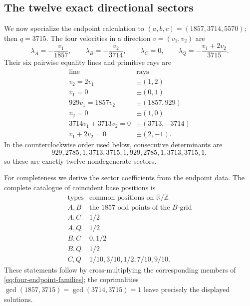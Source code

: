 \documentclass[11pt,reqno,letterpaper]{amsart}
\numberwithin{equation}{section}
\theoremstyle{definition}
\theoremstyle{remark}
\begin{document}
\subsection{The twelve exact directional sectors}

We now specialize the endpoint calculation to
\((a,b,c)=(1857,3714,5570)\); then \(q=3715\).  The four velocities in a
direction \(v=(v_1,v_2)\) are
\begin{equation}\label{eq:four-endpoint-velocities}
 \lambda_A=-\frac{v_1}{1857},\qquad
 \lambda_B=-\frac{v_2}{3714},\qquad
 \lambda_C=0,\qquad
 \lambda_Q=-\frac{v_1+2v_2}{3715}.
\end{equation}
Their six pairwise equality lines and primitive rays are
\begin{equation}\label{eq:six-fan-walls}
 \begin{array}{c|c}
 \text{line}&\text{rays}\\ \hline
 v_2=2v_1&\pm(1,2)\\
 v_1=0&\pm(0,1)\\
 929v_1=1857v_2&\pm(1857,929)\\
 v_2=0&\pm(1,0)\\
 3714v_1+3713v_2=0&\pm(3713,-3714)\\
 v_1+2v_2=0&\pm(2,-1).
 \end{array}
\end{equation}
In the counterclockwise order used below, consecutive determinants are
\[
 929,2785,1,3713,3715,1,929,2785,1,3713,3715,1,
\]
so these are exactly twelve nondegenerate sectors.

For completeness we derive the sector coefficients from the endpoint
data.  The complete catalogue of coincident base positions is
\begin{equation}\label{eq:tie-catalogue}
 \begin{array}{c|l}
 \text{types}&\text{common positions on }\mathbb R/\mathbb Z\\ \hline
 A,B&\text{the \(1857\) odd points of the \(B\)-grid}\\
 A,C&1/2\\
 A,Q&1/2\\
 B,C&0,1/2\\
 B,Q&1/2\\
 C,Q&1/10,3/10,1/2,7/10,9/10.
 \end{array}
\end{equation}
These statements follow by cross-multiplying the corresponding members
of \eqref{eq:four-endpoint-families}; the coprimalities
\(\gcd(1857,3715)=\gcd(3714,3715)=1\) leave precisely the displayed
solutions.
\end{document}
